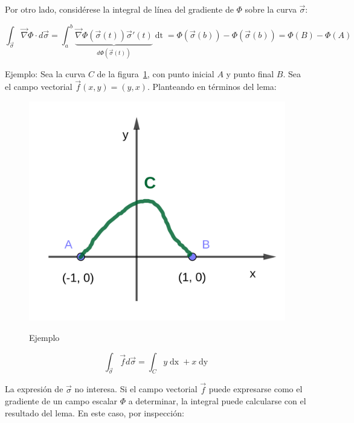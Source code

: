 \documentclass{article}
\begin{document}
Por otro lado, considérese la integral de línea del gradiente de $\Phi$ sobre la curva $\overrightarrow{\sigma}$:

\begin{equation}
\int_{\overrightarrow{\sigma}} \overrightarrow{\nabla}\Phi \cdot d\overrightarrow{\sigma} = \int_a^b \underbrace{ \overrightarrow{\nabla}\Phi( \overrightarrow{\sigma}(t) ) \overrightarrow{\sigma}'(t) }_{d\Phi(\overrightarrow{\sigma}(t))} \mathop{dt} = \Phi(\overrightarrow{\sigma}(b)) - \Phi(\overrightarrow{\sigma}(b)) = \Phi(B) - \Phi(A)
\end{equation}

Ejemplo: Sea la curva $C$ de la figura~\ref{fig:ccej}, con punto inicial $A$ y punto final $B$. Sea el campo vectorial $\overrightarrow{f}(x,y) = (y, x)$. Planteando en términos del lema:

\begin{figure}[ht]
\centering
\caption{Ejemplo}
\includegraphics[scale=1]{img/teo_fig022_ccej.png}
\label{fig:ccej}
\end{figure}

\begin{equation}
\int_{\overrightarrow{\sigma}} \overrightarrow{f} d\overrightarrow{\sigma} = \int_C y \mathop{dx} + x \mathop{dy}
\end{equation}

La expresión de $\overrightarrow{\sigma}$ no interesa. Si el campo vectorial $\overrightarrow{f}$ puede expresarse como el gradiente de un campo escalar $\Phi$ a determinar, la integral puede calcularse con el resultado del lema. En este caso, por inspección:
\end{document}
